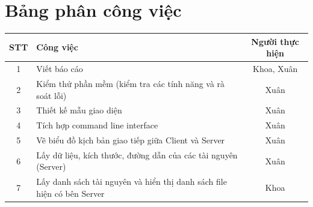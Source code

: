 \documentclass[a4paper,12pt]{report}
\begin{document}
\section{Bảng phân công việc}
\begin{center}
  \renewcommand{\arraystretch}{1.5}
  \begin{tabular}{|c|p{}|c|}
    \hline
    \textbf{STT} & \textbf{Công việc}                                                                                                                                                                                                  & \textbf{Người thực hiện} \\\hline
    1            & Viết báo cáo                                                                                                                                                                                                        & Khoa, Xuân               \\\hline
    2            & Kiểm thử phần mềm (kiểm tra các tính năng và rà soát lỗi)                                                                                                                                                           & Xuân                     \\\hline
    3            & Thiết kế mẫu giao diện                                                                                                                                                                                              & Xuân                     \\\hline
    4            & Tích hợp command line interface                                                                                                                                                                                     & Xuân                     \\\hline
    5            & Vẽ biểu đồ kịch bản giao tiếp giữa Client và Server                                                                                                                                                                 & Xuân                     \\\hline
    6            & Lấy dữ liệu, kích thước, đường dẫn của các tài nguyên (Server)                                                                                                                                                      & Xuân                     \\\hline
    7            & Lấy danh sách tài nguyên và hiển thị danh sách file hiện có bên Server                                                                                                                                              & Khoa                     \\\hline

\end{tabular}
\end{center}
\end{document}
